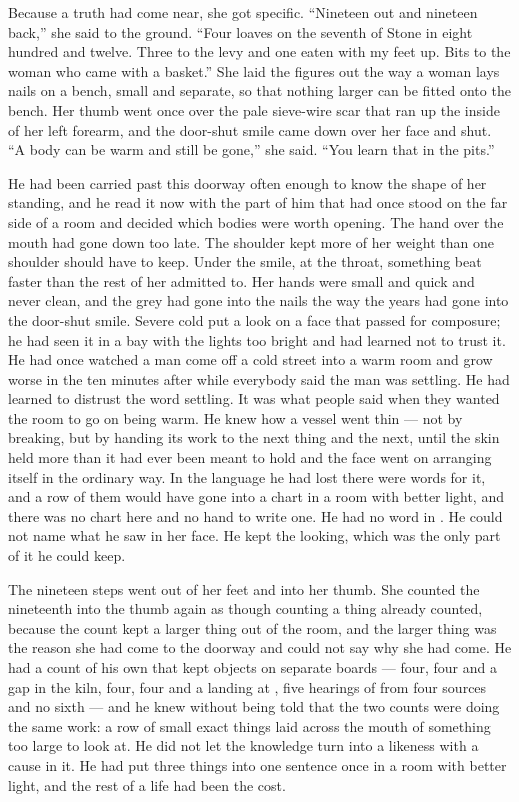 Because a truth had come near, she got specific. “Nineteen out and nineteen back,” she said to the ground. “Four loaves on the seventh of Stone in eight hundred and twelve. Three to the levy and one eaten with my feet up. Bits to the woman who came with a basket.” She laid the figures out the way a woman lays nails on a bench, small and separate, so that nothing larger can be fitted onto the bench. Her thumb went once over the pale sieve-wire scar that ran up the inside of her left forearm, and the door-shut smile came down over her face and shut. “A body can be warm and still be gone,” she said. “You learn that in the pits.”

He had been carried past this doorway often enough to know the shape of her standing, and he read it now with the part of him that had once stood on the far side of a room and decided which bodies were worth opening. The hand over the mouth had gone down too late. The shoulder kept more of her weight than one shoulder should have to keep. Under the smile, at the throat, something beat faster than the rest of her admitted to. Her hands were small and quick and never clean, and the grey had gone into the nails the way the years had gone into the door-shut smile. Severe cold put a look on a face that passed for composure; he had seen it in a bay with the lights too bright and had learned not to trust it. He had once watched a man come off a cold street into a warm room and grow worse in the ten minutes after while everybody said the man was settling. He had learned to distrust the word settling. It was what people said when they wanted the room to go on being warm. He knew how a vessel went thin --- not by breaking, but by handing its work to the next thing and the next, until the skin held more than it had ever been meant to hold and the face went on arranging itself in the ordinary way. In the language he had lost there were words for it, and a row of them would have gone into a chart in a room with better light, and there was no chart here and no hand to write one. He had no word in . He could not name what he saw in her face. He kept the looking, which was the only part of it he could keep.

The nineteen steps went out of her feet and into her thumb. She counted the nineteenth into the thumb again as though counting a thing already counted, because the count kept a larger thing out of the room, and the larger thing was the reason she had come to the doorway and could not say why she had come. He had a count of his own that kept objects on separate boards --- four, four and a gap in the kiln, four, four and a landing at , five hearings of  from four sources and no sixth --- and he knew without being told that the two counts were doing the same work: a row of small exact things laid across the mouth of something too large to look at. He did not let the knowledge turn into a likeness with a cause in it. He had put three things into one sentence once in a room with better light, and the rest of a life had been the cost.

